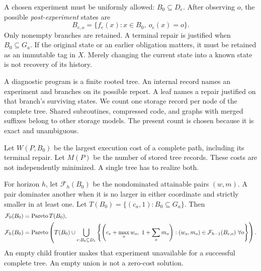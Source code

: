 A chosen experiment must be uniformly allowed: $B_0\subseteq D_e$. After observing $o$, the possible \emph{post-experiment} states are
\begin{equation}\label{SII:eq:post}
B_{e,o}=\{f_e(x):x\in B_0,\ o_e(x)=o\}.
\end{equation}
Only nonempty branches are retained. A terminal repair is justified when $B_0\subseteq G_a$. If the original state or an earlier obligation matters, it must be retained as an immutable tag in $X$. Merely changing the current state into a known state is not recovery of its history.

A diagnostic program is a finite rooted tree. An internal record names an experiment and branches on its possible report. A leaf names a repair justified on that branch's surviving states. We count one storage record per node of the complete tree. Shared subroutines, compressed code, and graphs with merged suffixes belong to other storage models. The present count is chosen because it is exact and unambiguous.

Let $W(P,B_0)$ be the largest execution cost of a complete path, including its terminal repair. Let $M(P)$ be the number of stored tree records. These costs are not independently minimized. A single tree has to realize both.

For horizon $h$, let $\mathcal F_h(B_0)$ be the nondominated attainable pairs $(w,m)$. A pair dominates another when it is no larger in either coordinate and strictly smaller in at least one. Let $T(B_0)=\{(c_a,1):B_0\subseteq G_a\}$. Then
\begin{align}\label{SII:eq:pareto}
\mathcal F_0(B_0)&=\operatorname{Pareto} T(B_0),\\
\mathcal F_h(B_0)&=\operatorname{Pareto}\left(T(B_0)\cup
\bigcup_{e:B_0\subseteq D_e}
\left\{\left(c_e+\max_o w_o,\ 1+\sum_o m_o\right):
(w_o,m_o)\in\mathcal F_{h-1}(B_{e,o})\ \forall o\right\}\right).
\nonumber
\end{align}
An empty child frontier makes that experiment unavailable for a successful complete tree. An empty union is not a zero-cost solution.

